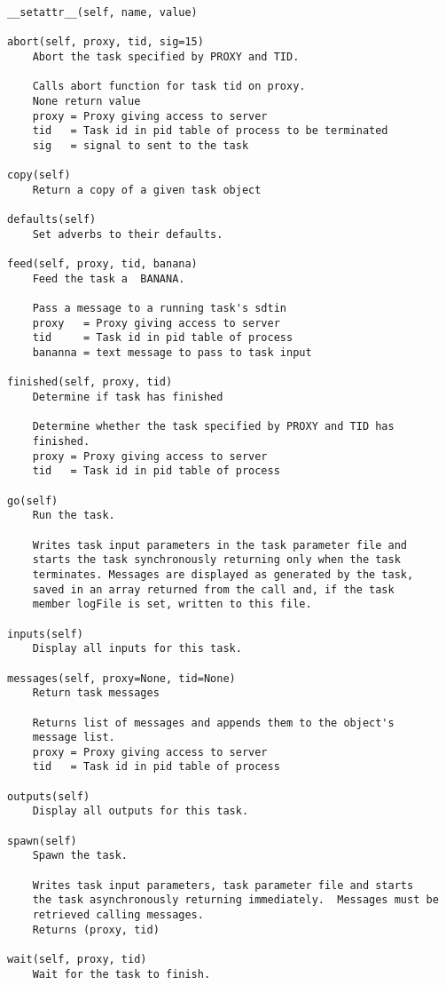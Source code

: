 \documentclass[11pt]{report}
\begin{document}
\begin{verbatim}
__setattr__(self, name, value)

abort(self, proxy, tid, sig=15)
    Abort the task specified by PROXY and TID.
    
    Calls abort function for task tid on proxy.
    None return value
    proxy = Proxy giving access to server
    tid   = Task id in pid table of process to be terminated
    sig   = signal to sent to the task

copy(self)
    Return a copy of a given task object

defaults(self)
    Set adverbs to their defaults.

feed(self, proxy, tid, banana)
    Feed the task a  BANANA.
    
    Pass a message to a running task's sdtin
    proxy   = Proxy giving access to server
    tid     = Task id in pid table of process
    bananna = text message to pass to task input

finished(self, proxy, tid)
    Determine if task has finished 
    
    Determine whether the task specified by PROXY and TID has
    finished.
    proxy = Proxy giving access to server
    tid   = Task id in pid table of process

go(self)
    Run the task.
    
    Writes task input parameters in the task parameter file and
    starts the task synchronously returning only when the task
    terminates. Messages are displayed as generated by the task,
    saved in an array returned from the call and, if the task
    member logFile is set, written to this file.

inputs(self)
    Display all inputs for this task.

messages(self, proxy=None, tid=None)
    Return task messages
    
    Returns list of messages and appends them to the object's
    message list.        
    proxy = Proxy giving access to server
    tid   = Task id in pid table of process

outputs(self)
    Display all outputs for this task.

spawn(self)
    Spawn the task.
     
    Writes task input parameters, task parameter file and starts
    the task asynchronously returning immediately.  Messages must be
    retrieved calling messages.
    Returns (proxy, tid)

wait(self, proxy, tid)
    Wait for the task to finish.
    

\end{verbatim}
\end{document}
